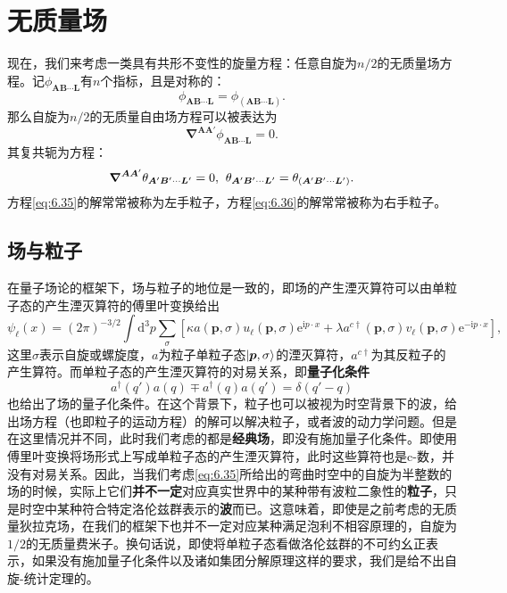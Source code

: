 \section{无质量场}

现在，我们来考虑一类具有共形不变性的旋量方程：任意自旋为$n/2$的无质量场方程。记$\phi _{\boldsymbol{AB} \cdots \boldsymbol{L}}$有$n$个指标，且是对称的：
\begin{equation*}
	\phi _{\boldsymbol{AB} \cdots \boldsymbol{L}} =\phi _{(\boldsymbol{AB} \cdots \boldsymbol{L})} .
\end{equation*}
那么自旋为$n/2$的无质量自由场方程可以被表达为
\begin{equation}
	\boldsymbol{\nabla }^{\boldsymbol{AA} '} \phi _{\boldsymbol{AB} \cdots \boldsymbol{L}} =0.
	\label{eq:6.35}
\end{equation}
其复共轭为方程：
\begin{equation}
	\boldsymbol{\nabla }^{\boldsymbol{AA} '} \theta _{\boldsymbol{A} '\boldsymbol{B} '\cdots \boldsymbol{L} '} =0,\kern+0.4em \theta _{\boldsymbol{A} '\boldsymbol{B} '\cdots \boldsymbol{L} '} =\theta _{(\boldsymbol{A} '\boldsymbol{B} '\cdots \boldsymbol{L} ')} .
	\label{eq:6.36}
\end{equation}
方程\ref{eq:6.35}的解常常被称为左手粒子，方程\ref{eq:6.36}的解常常被称为右手粒子。

\subsection{场与粒子}

在量子场论的框架下，场与粒子的地位是一致的，即场的产生湮灭算符可以由单粒子态的产生湮灭算符的傅里叶变换给出
\begin{equation}
	\psi _{\ell }( x) =( 2\pi )^{-3/2}\int \mathrm{d}^{3} p\sum _{\sigma } [\kappa a(\boldsymbol{p} ,\sigma ) u_{\ell }(\boldsymbol{p} ,\sigma )\mathrm{e}^{\mathrm{i} p\cdot x} +\lambda a^{c\dagger }(\boldsymbol{p} ,\sigma ) v_{\ell }(\boldsymbol{p} ,\sigma )\mathrm{e}^{-\mathrm{i} p\cdot x} ],
	\label{eq:6.37}
\end{equation}
这里$\sigma $表示自旋或螺旋度，$a$为粒子单粒子态$\ket{\boldsymbol{p} ,\sigma }$的湮灭算符，$a^{c\dagger }$为其反粒子的产生算符。而单粒子态的产生湮灭算符的对易关系，即\textbf{量子化条件}
\begin{equation*}
	a^{\dagger }( q') a( q) \mp a^{\dagger }( q) a( q') =\delta ( q'-q)
\end{equation*}
也给出了场的量子化条件。在这个背景下，粒子也可以被视为时空背景下的波，给出场方程（也即粒子的运动方程）的解可以解决粒子，或者波的动力学问题。但是在这里情况并不同，此时我们考虑的都是\textbf{经典场}，即没有施加量子化条件。即使用傅里叶变换将场形式上写成单粒子态的产生湮灭算符，此时这些算符也是c-数，并没有对易关系。因此，当我们考虑\ref{eq:6.35}所给出的弯曲时空中的自旋为半整数的场的时候，实际上它们\textbf{并不一定}对应真实世界中的某种带有波粒二象性的\textbf{粒子}，只是时空中某种符合特定洛伦兹群表示的\textbf{波}而已。这意味着，即使是之前考虑的无质量狄拉克场，在我们的框架下也并不一定对应某种满足泡利不相容原理的，自旋为$1/2$的无质量费米子。换句话说，即使将单粒子态看做洛伦兹群的不可约幺正表示，如果没有施加量子化条件以及诸如集团分解原理这样的要求，我们是给不出自旋-统计定理的。




